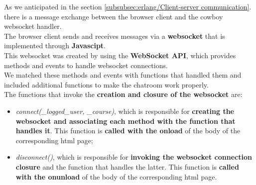 As we anticipated in the section \vref{subsubsec:erlang/Client-server communication}. there is a message exchange between the browser client and the cowboy websocket handler.\\
The browser client sends and receives messages via a \textbf{websocket} that is implemented through \textbf{Javascipt}.\\
This websocket was created by using the \textbf{WebSocket API}, which provides methods and events to handle websocket connections.\\
We matched these methods and events with functions that handled them and included additional functions to make the chatroom work properly.\\

The functions that invoke the \textbf{creation and closure of the websocket} are:
\begin{itemize}
    \item \textit{connect(\_logged\_user, \_course)}, which is responsible for \textbf{creating the websocket and associating each method with the function that handles it}. This function is \textbf{called with the onload} of the body of the corresponding html page;
    \item \textit{disconnect()}, which is responsible for \textbf{invoking the websocket connection closure} and the function that handles the latter. This function is \textbf{called with the onunload} of the body of the corresponding html page. \\
\end{itemize}

